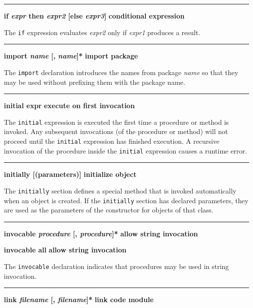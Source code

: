 \bigskip\hrule\vspace{0.1cm}
\noindent
{\bf \textbf{if} \textit{expr} then \textit{expr2} [else \textit{expr3}] } \hfill {\bf conditional expression}

\noindent
{}The \texttt{if} expression evaluates \textit{expr2} only if
\textit{expr1} produces a result.

\bigskip\hrule\vspace{0.1cm}
\noindent
{\bf \textbf{import} \textit{name} [, \textit{name}]* } \hfill {\bf import package}

\noindent
{}The \texttt{import} declaration introduces the names from
package \textit{name} so that they may be used without prefixing them
with the package name.

\bigskip\hrule\vspace{0.1cm}
\noindent
{\bf initial expr } \hfill {\bf execute on first invocation}

\noindent
{}The \texttt{initial} expression is executed the first
time a procedure or method is invoked.
Any subsequent invocations (of the procedure or method) \ConcurrencyIssue
will not proceed until the \texttt{initial} expression has finished execution.
A recursive invocation of the procedure inside the \texttt{initial} expression
causes a runtime error.

\bigskip\hrule\vspace{0.1cm}
\noindent
{\bf \textbf{initially} [(parameters)] } \hfill {\bf initialize object}

\noindent
{}The \texttt{initially} section defines a special method
that is invoked automatically when an object is created. If the
\texttt{initially} section has declared parameters, they are used as
the parameters of the constructor for objects
of that class.

\bigskip\hrule\vspace{0.1cm}
\noindent
{\bf \textbf{invocable} \textit{procedure} [, \textit{procedure}]* } \hfill {\bf allow string invocation}

\noindent
{}
{\textbf{invocable all} } \hfill {\bf allow string invocation}

\noindent
The \texttt{invocable} declaration indicates that procedures may be used
in string invocation.

\bigskip\hrule\vspace{0.1cm}
\noindent
{\bf \textbf{link} \textit{filename} [, \textit{filename}]* } \hfill {\bf link code module}

